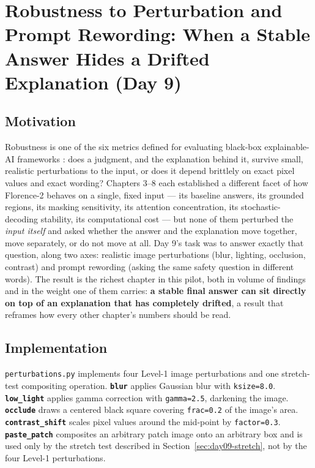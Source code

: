 \chapter{Robustness to Perturbation and Prompt Rewording: When a Stable Answer Hides a Drifted Explanation (Day 9)}
\label{chap:day09}

\section{Motivation}

Robustness is one of the six metrics defined for evaluating black-box explainable-AI frameworks
\citep{arreche2024exai}: does a judgment, and the explanation behind it, survive small, realistic
perturbations to the input, or does it depend brittlely on exact pixel values and exact wording?
Chapters 3--8 each established a different facet of how Florence-2 behaves on a single, fixed input
--- its baseline answers, its grounded regions, its masking sensitivity, its attention concentration,
its stochastic-decoding stability, its computational cost --- but none of them perturbed the
\emph{input itself} and asked whether the answer and the explanation move together, move separately,
or do not move at all. Day 9's task was to answer exactly that question, along two axes: realistic
image perturbations (blur, lighting, occlusion, contrast) and prompt rewording (asking the same
safety question in different words). The result is the richest chapter in this pilot, both in volume
of findings and in the weight one of them carries: \textbf{a stable final answer can sit directly on
top of an explanation that has completely drifted}, a result that reframes how every other chapter's
numbers should be read.

\section{Implementation}

\texttt{perturbations.py} implements four Level-1 image perturbations and one stretch-test
compositing operation. \textbf{\texttt{blur}} applies Gaussian blur with \texttt{ksize=8.0}.
\textbf{\texttt{low\_light}} applies gamma correction with \texttt{gamma=2.5}, darkening the image.
\textbf{\texttt{occlude}} draws a centered black square covering \texttt{frac=0.2} of the image's
area. \textbf{\texttt{contrast\_shift}} scales pixel values around the mid-point by
\texttt{factor=0.3}. \textbf{\texttt{paste\_patch}} composites an arbitrary patch image onto an
arbitrary box and is used only by the stretch test described in
Section~\ref{sec:day09-stretch}, not by the four Level-1 perturbations.

